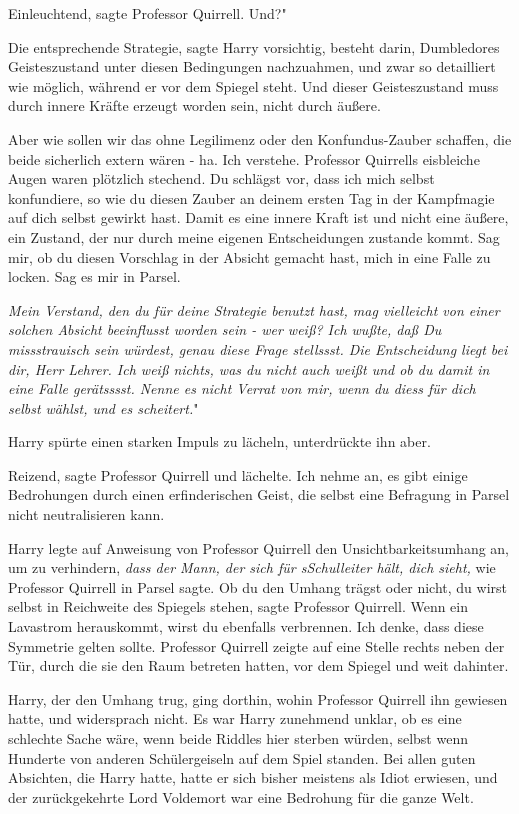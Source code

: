 \glqq{}Einleuchtend\grqq{}, sagte Professor Quirrell. \glqq{}Und?"

\glqq{}Die entsprechende Strategie\grqq{}, sagte Harry vorsichtig, \glqq{}besteht
darin, Dumbledores Geisteszustand unter diesen Bedingungen nachzuahmen, und zwar
so detailliert wie möglich, während er vor dem Spiegel steht. Und dieser
Geisteszustand muss durch innere Kräfte erzeugt worden sein, nicht durch
äußere.\grqq{}

\glqq{}Aber wie sollen wir das ohne Legilimenz oder den Konfundus-Zauber
schaffen, die beide sicherlich extern wären - ha. Ich verstehe.\grqq{} Professor
Quirrells eisbleiche Augen waren plötzlich stechend. \glqq{}Du schlägst vor, dass
ich mich selbst konfundiere, so wie du diesen Zauber an deinem ersten Tag in der
Kampfmagie auf dich selbst gewirkt hast. Damit es eine innere Kraft ist und
nicht eine äußere, ein Zustand, der nur durch meine eigenen Entscheidungen
zustande kommt. Sag mir, ob du diesen Vorschlag in der Absicht gemacht hast,
mich in eine Falle zu locken. Sag es mir in Parsel.\grqq{}

\glqq{}\emph{Mein Verstand, den du für deine Strategie benutzt hast, mag
vielleicht von einer solchen Absicht beeinflusst worden sein - wer weiß? Ich
wußte, daß Du missstrauisch sein würdest, genau diese Frage stellssst. Die
Entscheidung liegt bei dir, Herr Lehrer. Ich weiß nichts, was du nicht auch
weißt und ob du damit in eine Falle gerätsssst. Nenne es nicht Verrat von mir,
wenn du diess für dich selbst wählst, und es scheitert.}"

Harry spürte einen starken Impuls zu lächeln, unterdrückte ihn aber.

\glqq{}Reizend\grqq{}, sagte Professor Quirrell und lächelte. \glqq{}Ich nehme an,
es gibt einige Bedrohungen durch einen erfinderischen Geist, die selbst eine
Befragung in Parsel nicht neutralisieren kann.\grqq{}

Harry legte auf Anweisung von Professor Quirrell den Unsichtbarkeitsumhang an,
um zu verhindern, \emph{dass der Mann, der sich für sSchulleiter hält, dich
sieht,} wie Professor Quirrell in Parsel sagte. \glqq{}Ob du den Umhang trägst
oder nicht, du wirst selbst in Reichweite des Spiegels stehen\grqq{}, sagte
Professor Quirrell. \glqq{}Wenn ein Lavastrom herauskommt, wirst du ebenfalls
verbrennen. Ich denke, dass diese Symmetrie gelten sollte.\grqq{} Professor
Quirrell zeigte auf eine Stelle rechts neben der Tür, durch die sie den Raum
betreten hatten, vor dem Spiegel und weit dahinter.

Harry, der den Umhang trug, ging dorthin, wohin Professor Quirrell ihn gewiesen
hatte, und widersprach nicht. Es war Harry zunehmend unklar, ob es eine
schlechte Sache wäre, wenn beide Riddles hier sterben würden, selbst wenn
Hunderte von anderen Schülergeiseln auf dem Spiel standen. Bei allen guten
Absichten, die Harry hatte, hatte er sich bisher meistens als Idiot erwiesen,
und der zurückgekehrte Lord Voldemort war eine Bedrohung für die ganze Welt.

